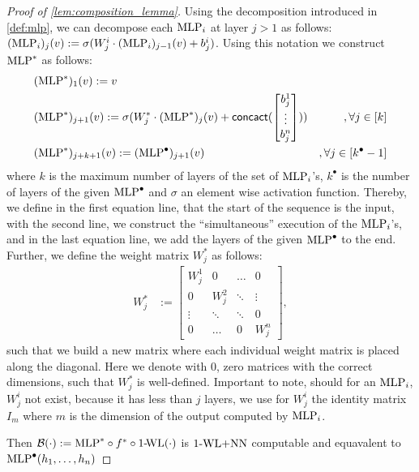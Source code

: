\begin{proof}[Proof of \cref{lem:composition_lemma}]
    Using the decomposition introduced in \cref{def:mlp}, we can decompose each $\text{MLP}_i$ at layer $j > 1$ as follows: $(\text{MLP}_i)_{j}(v) := \sigma(W^{i}_{j} \cdot (\text{MLP}_i)_{j-1}(v) + b^i_j)$. Using this notation we construct $\text{MLP}^*$ as follows:
    \begin{align*}
        &(\text{MLP}^*)_{1}(v) := v\\
        &(\text{MLP}^*)_{j+1}(v) := \sigma(W^*_j \cdot (\text{MLP}^*)_{j} (v) + \textsf{concact}(
            \begin{bmatrix}
                b^1_j\\
                \vdots\\
                b^n_j
            \end{bmatrix})) &,\forall j \in [k]\\
        &(\text{MLP}^*)_{j+k+1}(v) := (\text{MLP}^\bullet)_{j+1}(v) &,\forall j \in [k^\bullet - 1]
    \end{align*}
    where $k$ is the maximum number of layers of the set of $\text{MLP}_i$'s, $k^\bullet$ is the number of layers of the given $\text{MLP}^\bullet$ and $\sigma$ an element wise activation function. Thereby, we define in the first equation line, that the start of the sequence is the input, with the second line, we construct the ``simultaneous'' execution of the $\text{MLP}_i$'s, and in the last equation line, we add the layers of the given $\text{MLP}^\bullet$ to the end. Further, we define the weight matrix $W_j^*$ as follows: 
    \begin{align*}
        W^*_j &:= \begin{bmatrix}
            W^1_j & 0 & \hdots & 0\\
            0 & W^2_j & \ddots & \vdots\\
            \vdots & \ddots & \ddots & 0\\
            0 & \hdots & 0 & W^n_j
        \end{bmatrix},
    \end{align*}
    such that we build a new matrix where each individual weight matrix is placed along the diagonal. Here we denote with $0$, zero matrices with the correct dimensions, such that $W_j^*$ is well-defined. Important to note, should for an $\text{MLP}_i$, $W^i_j$ not exist, because it has less than $j$ layers, we use for $W^i_j$ the identity matrix $I_m$ where $m$ is the dimension of the output computed by $\text{MLP}_i$.


    Then $\mathcal{B}(\cdot) := \text{MLP}^* \circ f^* \circ \text{1-\!WL}(\cdot)$ is $\text{1-WL+NN}$ computable and equavalent to $\text{MLP}^\bullet(h_1, \dots, h_n)$ 
\end{proof}